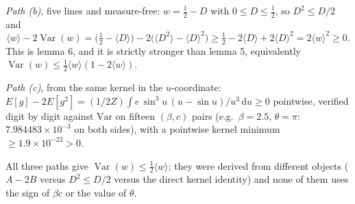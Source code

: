 \emph{Path (b)}, five lines and measure-free: $w=\tfrac12-D$ with $0\le D\le\tfrac12$, so
$D^{2}\le D/2$ and
\begin{equation}
\langle w\rangle-2\operatorname{Var}(w)
=\bigl(\tfrac12-\langle D\rangle\bigr)-2\bigl(\langle D^{2}\rangle-\langle D\rangle^{2}\bigr)
\ge\tfrac12-2\langle D\rangle+2\langle D\rangle^{2}
=2\langle w\rangle^{2}\ge0 .
\label{eq:h1s-r05}
\end{equation}
This is lemma 6, and it is strictly stronger than lemma 5, equivalently
$\operatorname{Var}(w)\le\tfrac12\langle w\rangle(1-2\langle w\rangle)$.

\emph{Path (c)}, from the same kernel in the $u$-coordinate:
$E[g]-2E[g^{2}]=(1/2Z)\int e\,\sin^{3}u\,(u-\sin u)/u^{3}\,\mathrm{d} u\ge0$ pointwise, verified digit by
digit against $\mathrm{Var}$ on fifteen $(\beta,c)$ pairs (e.g.\ $\beta=2.5$, $\theta=\pi$:
$7.984483\times10^{-3}$ on both sides), with a pointwise kernel minimum $\ge1.9\times10^{-22}>0$.

All three paths give $\operatorname{Var}(w)\le\tfrac12\langle w\rangle$; they were derived from
different objects ($A-2B$ versus $D^{2}\le D/2$ versus the direct kernel identity) and none of them
uses the sign of $\beta c$ or the value of $\theta$. \LT


